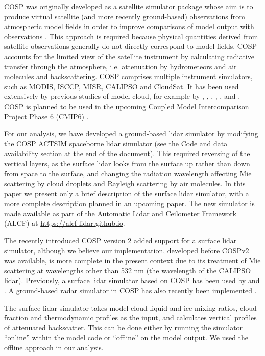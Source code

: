 COSP was originally developed as a satellite simulator package whose aim is to
produce virtual satellite (and more recently ground-based) observations from
atmospheric model fields in order to improve comparisons of model output with
observations \citep{bodas-salcedo2011}. This approach is required because
physical quantities derived from satellite observations generally do not
directly correspond to model fields. COSP accounts for the limited view of the
satellite instrument by calculating radiative transfer through the atmosphere,
i.e. attenuation by hydrometeors and air molecules and backscattering. COSP
comprises multiple instrument simulators, such as MODIS, ISCCP, MISR, CALIPSO
and CloudSat. It has been used extensively by previous studies of model cloud,
for example by \cite{kay2012}, \cite{franklin2013}, \cite{klein2013},
\cite{williams2017}, \cite{jin2017} , and \cite{schuddeboom2018a}. COSP is
planned to be used in the upcoming Coupled Model Intercomparison Project Phase 6
(CMIP6) \citep{webb2017}.

For our analysis, we have developed a ground-based lidar simulator by modifying
the COSP ACTSIM spaceborne lidar simulator \citep{chiriaco2006} (see
the Code and data availability section at the end of the document). This
required reversing of the vertical layers, as the surface lidar looks from the
surface up rather than down from space to the surface, and changing the
radiation wavelength affecting Mie scattering by cloud droplets and Rayleigh
scattering by air molecules. In this paper we present only a brief description
of the surface lidar simulator, with a more complete description planned in an
upcoming paper. The new simulator is made available as part of the Automatic
Lidar and Ceilometer Framework (ALCF) at \url{https://alcf-lidar.github.io}.

The recently introduced COSP version 2 \citep{swales2018} added support for a
surface lidar simulator, although we believe our implementation, developed
before COSPv2 was available, is more complete in the present context due to its
treatment of Mie scattering at wavelengths other than 532 nm (the wavelength of
the CALIPSO lidar). Previously, a surface lidar simulator based on COSP has
been used by \cite{chiriaco2018} and \cite{bastin2018}. A ground-based radar
simulator in COSP has also recently been implemented \citep{zhang2018}. 

The surface lidar simulator takes model cloud liquid and ice mixing ratios,
cloud fraction and thermodynamic profiles as the input, and calculates vertical
profiles of attenuated backscatter. This can be done either by running the
simulator ``online'' within the model code or ``offline'' on the model output.
We used the offline approach in our analysis.

